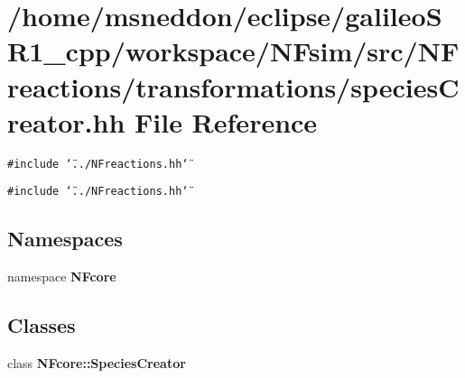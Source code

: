 \section{/home/msneddon/eclipse/galileoSR1\_\-cpp/workspace/NFsim/src/NFreactions/transformations/speciesCreator.hh File Reference}
\label{speciesCreator_8hh}


{\tt \#include \char`\"{}../NFreactions.hh\char`\"{}}\par
{\tt \#include \char`\"{}../NFreactions.hh\char`\"{}}\par
\subsection*{Namespaces}
\begin{CompactItemize}
\item 
namespace {\bf NFcore}
\end{CompactItemize}
\subsection*{Classes}
\begin{CompactItemize}
\item 
class {\bf NFcore::SpeciesCreator}
\end{CompactItemize}

